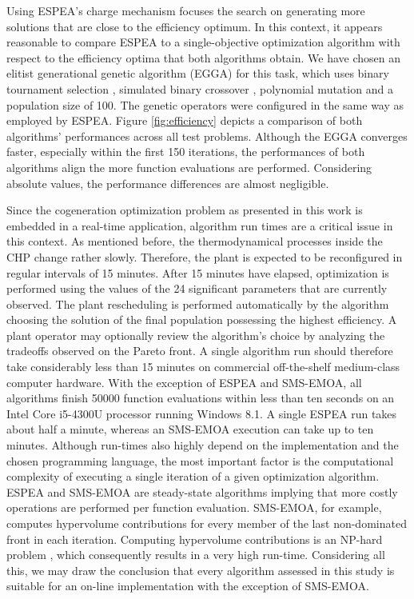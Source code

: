 Using ESPEA's charge mechanism focuses the search on generating more solutions that are close to the efficiency optimum. In this context, it appears reasonable to compare ESPEA to a single-objective optimization algorithm with respect to the efficiency optima that both algorithms obtain. We have chosen an elitist generational genetic algorithm (EGGA) for this task, which uses binary tournament selection \cite{goldberg1991comparative}, simulated binary crossover \cite{sbx}, polynomial mutation \cite{polynomialmutation} and a population size of 100. The genetic operators were configured in the same way as employed by ESPEA. Figure \ref{fig:efficiency} depicts a comparison of both algorithms' performances across all test problems. Although the EGGA converges faster, especially within the first 150 iterations, the performances of both algorithms align the more function evaluations are performed. Considering absolute values, the performance differences are almost negligible.

Since the cogeneration optimization problem as presented in this work is embedded in a real-time application, algorithm run times are a critical issue in this context.
%
As mentioned before, the thermodynamical processes inside the CHP change rather slowly. Therefore, the plant is expected to be reconfigured in regular intervals of 15 minutes.
After 15 minutes have elapsed, optimization is performed using the values of the 24 significant parameters that are currently observed.
%
The plant rescheduling is performed automatically by the algorithm choosing the solution of the final population possessing the highest efficiency. A plant operator may optionally review the algorithm's choice by analyzing the tradeoffs observed on the Pareto front.
%
A single algorithm run should therefore take considerably less than 15 minutes on commercial off-the-shelf medium-class computer hardware. With the exception of ESPEA and SMS-EMOA, all algorithms finish \num{50000} function evaluations within less than ten seconds on an Intel Core i5-4300U processor running Windows 8.1. A single ESPEA run takes about half a minute, whereas an SMS-EMOA execution can take up to ten minutes. Although run-times also highly depend on the implementation and the chosen programming language, the most important factor is the computational complexity of executing a single iteration of a given optimization algorithm. ESPEA and SMS-EMOA are steady-state algorithms implying that more costly operations are performed per function evaluation. SMS-EMOA, for example, computes hypervolume contributions for every member of the last non-dominated front in each iteration. Computing hypervolume contributions is an NP-hard problem \cite{hypervolumecontribution}, which consequently results in a very high run-time. Considering all this, we may draw the conclusion that every algorithm assessed in this study is suitable for an on-line implementation with the exception of SMS-EMOA.


